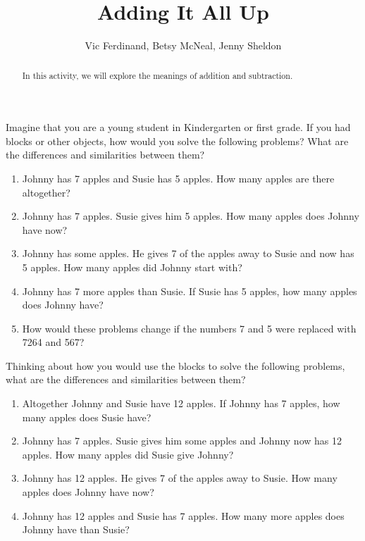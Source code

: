 \documentclass{ximera}
\title{Adding It All Up}
\author{Vic Ferdinand, Betsy McNeal, Jenny Sheldon}
\begin{document}
\begin{abstract} In this activity, we will explore the meanings of addition and subtraction. \end{abstract}
\maketitle



\begin{problem}
Imagine that you are a young student in Kindergarten or first grade.  If you had blocks or other objects, how would you solve the following problems?  What are the differences and similarities between them?
\begin{enumerate}
\item Johnny has 7 apples and Susie has 5 apples.  How many apples are there altogether?
\item Johnny has 7 apples.  Susie gives him 5 apples.  How many apples does Johnny have now?
\item Johnny has some apples.  He gives 7 of the apples away to Susie and now has 5 apples.  How many apples did Johnny start with?
\item Johnny has 7 more apples than Susie.  If Susie has 5 apples, how many apples does Johnny have?
\item How would these problems change if the numbers 7 and 5 were replaced with 7264 and 567?
\end{enumerate}
\end{problem}

\begin{problem}
 Thinking about how you would use the blocks to solve the following problems, what are the differences and similarities between them?
\begin{enumerate}
\item Altogether Johnny and Susie have 12 apples.  If Johnny has 7 apples, how many apples does Susie have?
\item Johnny has 7 apples.  Susie gives him some apples and Johnny now has 12 apples.  How many apples did Susie give Johnny?
\item Johnny has 12 apples.  He gives 7 of the apples away to Susie.  How many apples does Johnny have now?
\item Johnny has 12 apples and Susie has 7 apples.  How many more apples does Johnny have than Susie?
\end{enumerate}
\end{problem}
\end{document}
